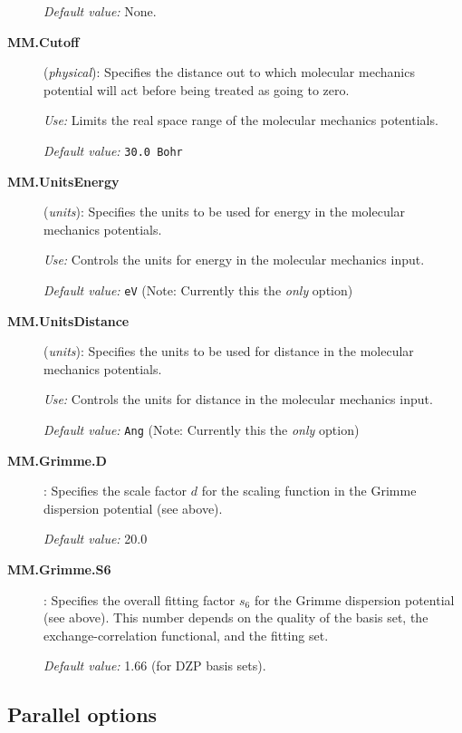 \documentclass[11pt]{article}
\begin{document}
\begin{description}
\begin{verbatim}
\end{verbatim}

{\it Default value:}  None.

\item[{\bf MM.Cutoff}] ({\it physical}):  Specifies the distance out to which molecular mechanics
potential will act before being treated as going to zero.

{\it Use:} Limits the real space range of the molecular mechanics
potentials.

{\it Default value:}  {\tt 30.0 Bohr}

\item[{\bf MM.UnitsEnergy}] ({\it units}):  Specifies the units to be used for energy in the
molecular mechanics potentials.

{\it Use:} Controls the units for energy in the molecular mechanics input.

{\it Default value:}  {\tt eV} (Note: Currently this the {\em only} option)

\item[{\bf MM.UnitsDistance}] ({\it units}):  Specifies the units to be used for distance in the
molecular mechanics potentials.

{\it Use:} Controls the units for distance in the molecular mechanics input.

{\it Default value:}  {\tt Ang} (Note: Currently this the {\em only} option)

\item[{\bf MM.Grimme.D}] :  Specifies the scale factor $d$ for the scaling function
in the Grimme dispersion potential (see above).

{\it Default value:}  { 20.0 }

\item[{\bf MM.Grimme.S6}] :  Specifies the overall fitting factor $s_6$ for the
Grimme dispersion potential (see above). This number depends on the
quality of the basis set, the exchange-correlation functional, and the
fitting set.

{\it Default value:}  { 1.66 } (for DZP basis sets).

\end{description}

\vspace{5pt}
\subsection{Parallel options}
\end{document}
